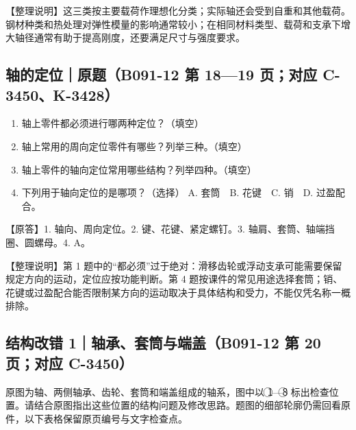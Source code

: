 \documentclass[zihao=5,a4paper,UTF8,fontset=fandol]{ctexart}
\begin{document}
【整理说明】这三类按主要载荷作理想化分类；实际轴还会受到自重和其他载荷。钢材种类和热处理对弹性模量的影响通常较小；在相同材料类型、载荷和支承下增大轴径通常有助于提高刚度，还要满足尺寸与强度要求。


\subsection{轴的定位｜原题（B091-12 第 18—19 页；对应 C-3450、K-3428）}

\begin{enumerate}
\item 
轴上零件都必须进行哪两种定位？（填空）


\item 
轴上常用的周向定位零件有哪些？列举三种。（填空）


\item 
轴上零件的轴向定位常用哪些结构？列举四种。（填空）


\item 
下列用于轴向定位的是哪项？（选择）
A. 套筒　B. 花键　C. 销　D. 过盈配合。



\end{enumerate}

【原答】1. 轴向、周向定位。2. 键、花键、紧定螺钉。3. 轴肩、套筒、轴端挡圈、圆螺母。4. A。


【整理说明】第 1 题中的“都必须”过于绝对：滑移齿轮或浮动支承可能需要保留规定方向的运动，定位应按功能判断。第 4 题按课件的常见用途选择套筒；销、花键或过盈配合能否限制某方向的运动取决于具体结构和受力，不能仅凭名称一概排除。




\subsection{结构改错 1｜轴承、套筒与端盖（B091-12 第 20 页；对应 C-3450）}

原图为轴、两侧轴承、齿轮、套筒和端盖组成的轴系，图中以 \textcircled{1}—\textcircled{8} 标出检查位置。请结合原图指出这些位置的结构问题及修改思路。题图的细部轮廓仍需回看原件，以下表格保留原页编号与文字检查点。
\end{document}
